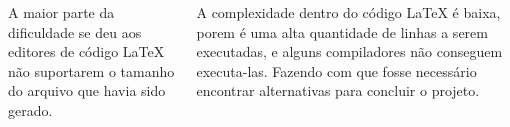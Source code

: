 \documentclass[14pt, a2paper, portrait]{tikzposter}
\begin{document}
\begin{columns}
{	A maior parte da dificuldade se deu aos editores de código {\LaTeX} não suportarem o tamanho do arquivo que havia sido gerado.\linebreak
	
	A complexidade dentro do código {\LaTeX} é baixa, porem é uma alta quantidade de linhas a serem executadas, e alguns compiladores não conseguem executa-las. Fazendo com que fosse necessário encontrar alternativas para concluir o projeto.\linebreak
}

\end{columns}

\end{document}
